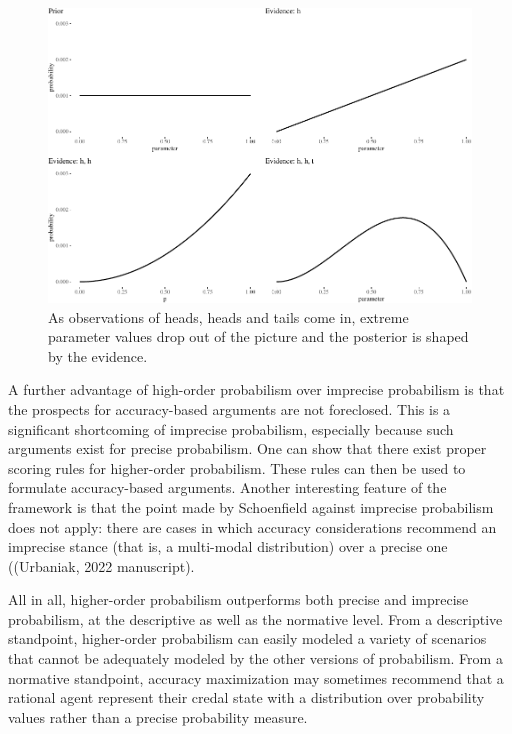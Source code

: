 \documentclass[
  10pt,
  dvipsnames,enabledeprecatedfontcommands]{scrartcl}
\begin{document}
\begin{figure}[t]

\begin{center}\includegraphics[width=1\linewidth]{chapter-outline_files/figure-latex/fig:inertia3-1} \end{center}
\caption{As observations of heads, heads and tails come in, extreme parameter values drop out of the picture and the posterior is shaped by the evidence.}
\label{fig:intertia2}
\end{figure}

A further advantage of high-order probabilism over imprecise probabilism
is that the prospects for accuracy-based arguments are not foreclosed.
This is a significant shortcoming of imprecise probabilism, especially
because such arguments exist for precise probabilism. One can show that
there exist proper scoring rules for higher-order probabilism. These
rules can then be used to formulate accuracy-based arguments. Another
interesting feature of the framework is that the point made by
Schoenfield against imprecise probabilism does not apply: there are
cases in which accuracy considerations recommend an imprecise stance
(that is, a multi-modal distribution) over a precise one ((Urbaniak,
2022 manuscript).

All in all, higher-order probabilism outperforms both precise and
imprecise probabilism, at the descriptive as well as the normative
level. From a descriptive standpoint, higher-order probabilism can
easily modeled a variety of scenarios that cannot be adequately modeled
by the other versions of probabilism. From a normative standpoint,
accuracy maximization may sometimes recommend that a rational agent
represent their credal state with a distribution over probability values
rather than a precise probability measure.
\end{document}
